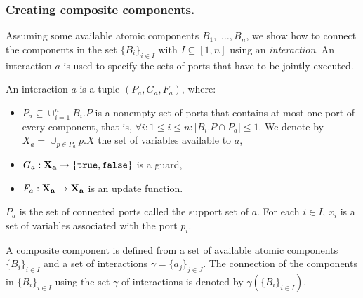 \subsubsection{Creating composite components.} Assuming some available atomic components $B_1,$ $\ldots,B_n$, we show how to connect the components in the set $\{B_i\}_{i\in I}$ with $I\subseteq [1,n]$ using an \emph{interaction}. An interaction $a$ is used to specify the sets of ports that have to be jointly executed.


\begin{definition}[Interaction]
\label{def:connector}
An interaction $a$ is a tuple $(P_a, G_a,F_a)$, where:
\begin{itemize}
\item $P_a \subseteq \cup_{i = 1} ^ { n } B_i.P$ is a nonempty set of ports that contains
at most one port of every component, that is, $\forall i: 1 \leq i \leq n: |B_i.P \cap P_a| \leq 1 $. We denote by $X_a = \cup_{p \in P_a} p.X$ the set of variables available to $a$,
\item $G_a : \mathbf{X_a} \rightarrow \{\mathtt{true}, \mathtt{false}\}$ is a guard, 
\item $F_a : \mathbf{X_a} \rightarrow \mathbf{X_a}$ is an update function. 
\end{itemize}
\end{definition}
%
$P_a$ is the set of connected ports called the support set of $a$. For each $i\in I$, $x_i$ is a set of variables associated with the port $p_i$.


%
\begin{definition}
  A composite component is defined from a set of available atomic components $\{B_i\}_{i\in I}$ and a set of interactions $\gamma=\{a_j\}_{j\in J}$.
The connection of the components in $\{B_i\}_{i\in I}$ using the set $\gamma$ of interactions is denoted by $\gamma(\{B_{i}\}_{i\in I})$.
\end{definition}


